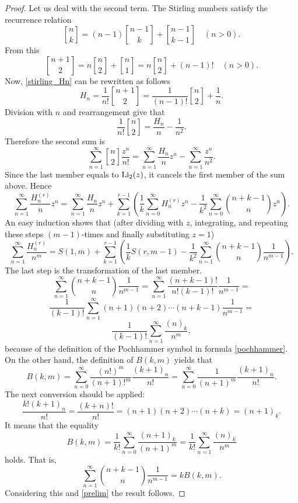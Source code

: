 \documentclass[a4paper,12pt]{amsart}
\begin{document}
\begin{proof}
Let us deal with the second term. The Stirling numbers satisfy the recurrence relation
\[{\genfrac[]{0pt}{}{{n}}{{k}}}=(n-1){\genfrac[]{0pt}{}{{n-1}}{{k}}}+{\genfrac[]{0pt}{}{{n-1}}{{k-1}}}\quad(n>0).\]
From this
\[{\genfrac[]{0pt}{}{{n+1}}{{2}}}=n{\genfrac[]{0pt}{}{{n}}{{2}}}+{\genfrac[]{0pt}{}{{n}}{{1}}}=n{\genfrac[]{0pt}{}{{n}}{{2}}}+(n-1)!\quad(n>0).\]
Now, \eqref{stirling_Hn} can be rewritten as follows
\[H_n=\frac{1}{n!}{\genfrac[]{0pt}{}{{n+1}}{{2}}}=\frac{1}{(n-1)!}{\genfrac[]{0pt}{}{{n}}{{2}}}+\frac{1}{n}.\]
Division with $n$ and rearrangement give that
\[\frac{1}{n!}{\genfrac[]{0pt}{}{{n}}{{2}}}=\frac{H_n}{n}-\frac{1}{n^2}.\]
Therefore the second sum is
\[\sum_{n=1}^\infty{\genfrac[]{0pt}{}{{n}}{{2}}}\frac{z^n}{n!}=\sum_{n=1}^\infty\frac{H_n}{n}z^n-\sum_{n=1}^\infty\frac{z^n}{n^2}.\]
Since the last member equals to ${\mathop{\textup{Li}}\nolimits}_2(z)$, it cancels the first member of the sum above. Hence
\[\sum_{n=1}^\infty \frac{H_n^{(r)}}{n}z^n=\sum_{n=1}^\infty\frac{H_n}{n}z^n+\sum_{k=1}^{r-1}\left(\frac{1}{k}\sum_{n=0}^\infty H_n^{(r)}z^n-\frac{1}{k^2}\sum_{n=0}^\infty\binom{n+k-1}{n}z^n\right).\]
An easy induction shows that (after dividing with $z$, integrating, and repeating these steps $(m-1)$-times and finally substituting $z=1$)
\begin{equation}
\sum_{n=1}^\infty \frac{H_n^{(r)}}{n^m}=S(1,m)+\sum_{k=1}^{r-1}\left(\frac{1}{k}S(r,m-1)-\frac{1}{k^2}\sum_{n=1}^\infty\binom{n+k-1}{n}\frac{1}{n^{m-1}}\right).\label{prelim}
\end{equation}
The last step is the transformation of the last member.
\[\sum_{n=1}^\infty\binom{n+k-1}{n}\frac{1}{n^{m-1}}=\sum_{n=1}^\infty\frac{(n+k-1)!}{n!(k-1)!}\frac{1}{n^{m-1}}=\]
\[\frac{1}{(k-1)!}\sum_{n=1}^\infty(n+1)(n+2)\cdots(n+k-1)\frac{1}{n^{m-1}}=\]
\[\frac{1}{(k-1)!}\sum_{n=1}^\infty\frac{(n)_k}{n^m},\]
because of the definition of the Pochhammer symbol in formula \eqref{pochhammer}.
On the other hand, the definition of $B(k,m)$ yields that
\[B(k,m)=\sum_{n=0}^\infty\frac{(n!)^m}{(n+1)!^m}\frac{(k+1)_n}{n!}=\sum_{n=0}^\infty\frac{1}{(n+1)^m}\frac{(k+1)_n}{n!}.\]
The next conversion should be applied:
\[\frac{k!(k+1)_n}{n!}=\frac{(k+n)!}{n!}=(n+1)(n+2)\cdots(n+k)=(n+1)_k.\]
It means that the equality
\begin{equation}
B(k,m)=\frac{1}{k!}\sum_{n=0}^\infty\frac{(n+1)_k}{(n+1)^m}=\frac{1}{k!}\sum_{n=1}^\infty\frac{(n)_k}{n^m}\label{Bkm}
\end{equation}
holds. That is,
\[\sum_{n=1}^\infty\binom{n+k-1}{n}\frac{1}{n^{m-1}}=kB(k,m).\]
Considering this and \eqref{prelim} the result follows.
\end{proof}
\end{document}
